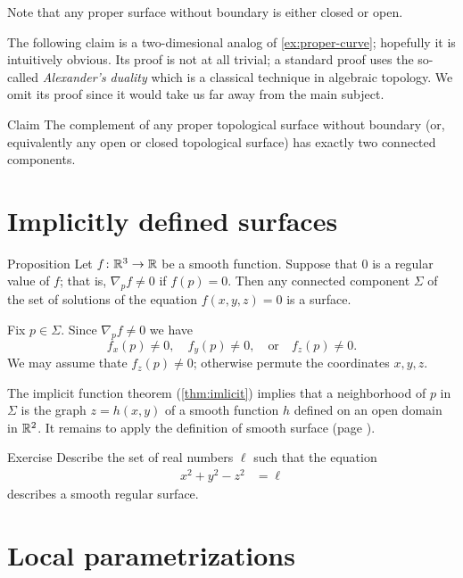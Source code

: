 Note that any proper surface without boundary is either closed or open.

The following claim is a two-dimesional analog of \ref{ex:proper-curve};
hopefully it is intuitively obvious. 
Its proof is not at all trivial; a standard proof uses the so-called \emph{Alexander's duality} which is a classical technique in algebraic topology. %
We omit its proof since it would take us far away from the main subject.

\begin{thm}{Claim}\label{clm:proper-divides}
The complement of any proper topological surface without boundary (or, equivalently any open or closed topological surface) has exactly two connected components. 
\end{thm}

\section{Implicitly defined surfaces}

\begin{thm}{Proposition}\label{prop:implicit-surface}
Let $f\colon\mathbb{R}^3\to \mathbb{R}$ be a smooth function.
Suppose that $0$ is a regular value of $f$;
that is, $\nabla_p f\ne 0$ if $f(p)=0$.
Then any connected component $\Sigma$ of the set of solutions of the equation $f(x,y,z)=0$ is a surface.
\end{thm}

Fix $p\in\Sigma$.
Since $\nabla_p f\ne 0$ we have 
\[f_x(p)\ne 0,\quad f_y(p)\ne 0,\quad \text{or}\quad f_z(p)\ne 0.\]
We may assume thate $f_z(p)\ne 0$;
otherwise permute the coordinates $x,y,z$.

The implicit function theorem (\ref{thm:imlicit}) implies that a neighborhood of $p$ in $\Sigma$ is the graph $z=h(x,y)$ of a smooth function $h$ defined on an open domain in $\mathbb{R}^2$.
It remains to apply the definition of smooth surface (page \pageref{page:def-smooth-surface}).
\qeds

\begin{thm}{Exercise}\label{ex:hyperboloinds}
Describe the set of real numbers $\ell$
such that the equation
\begin{align*}
x^2+y^2-z^2&=\ell
\end{align*}
describes a smooth regular surface.
\end{thm}

\section{Local parametrizations}

